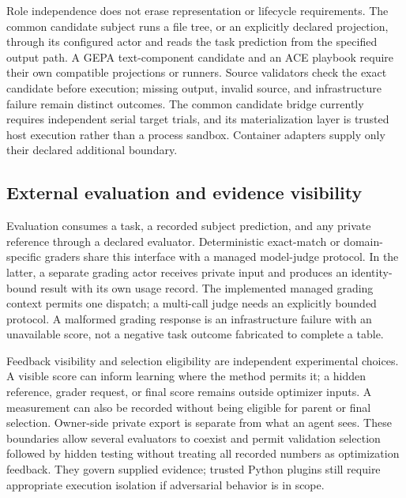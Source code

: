 Role independence does not erase representation or lifecycle requirements. The common candidate subject runs a file tree, or an explicitly declared projection, through its configured actor and reads the task prediction from the specified output path. A GEPA text-component candidate and an ACE playbook require their own compatible projections or runners. Source validators check the exact candidate before execution; missing output, invalid source, and infrastructure failure remain distinct outcomes. The common candidate bridge currently requires independent serial target trials, and its materialization layer is trusted host execution rather than a process sandbox. Container adapters supply only their declared additional boundary.

\subsection{External evaluation and evidence visibility}
Evaluation consumes a task, a recorded subject prediction, and any private reference through a declared evaluator. Deterministic exact-match or domain-specific graders share this interface with a managed model-judge protocol. In the latter, a separate grading actor receives private input and produces an identity-bound result with its own usage record. The implemented managed grading context permits one dispatch; a multi-call judge needs an explicitly bounded protocol. A malformed grading response is an infrastructure failure with an unavailable score, not a negative task outcome fabricated to complete a table.

Feedback visibility and selection eligibility are independent experimental choices. A visible score can inform learning where the method permits it; a hidden reference, grader request, or final score remains outside optimizer inputs. A measurement can also be recorded without being eligible for parent or final selection. Owner-side private export is separate from what an agent sees. These boundaries allow several evaluators to coexist and permit validation selection followed by hidden testing without treating all recorded numbers as optimization feedback. They govern supplied evidence; trusted Python plugins still require appropriate execution isolation if adversarial behavior is in scope.

